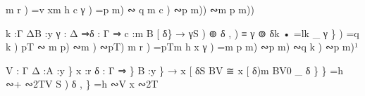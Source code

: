 \documentclass{acm_proc_article-sp}
\begin{document}
{\begin{code}
m r ) =\AgdaFunction{ [⊚]}v xm h c γ ) =p m\AgdaFunction{ [⊚]}) ∾ q m c ) ∾p m\AgdaFunction{ [⊚]})\AgdaFunction{ -}) ∾m p m\AgdaFunction{ [⊚]})\AgdaFunction{ -})

k :\AgdaBound{\{}Γ Δ\AgdaBound{\{}B :y \AgdaBound{(}γ : Δ ⇒\AgdaBound{\{}δ : Γ ⇒ \AgdaBound{\{}c :m \AgdaBound{(}B [ δ\AgdaFunction{ ]}\} → \AgdaBound{(}γ\AgdaFunction{ +}S ) ⊚ \AgdaBound{(}δ , ) ≡ γ ⊚ δk • =lk \AgdaInductiveConstructor{(\_,}\_ γ \AgdaBound{\{}\} ) =q k ) p\AgdaFunction{ [⊚]}T ∾ m p\AgdaFunction{ [+S]}) ∾m ) ∾p\AgdaFunction{ [⊚]}T\AgdaFunction{ -})
m r ) =pTm h x γ ) =m p m\AgdaFunction{ [+S]}) ∾p m\AgdaFunction{ [⊚]}) ∾q k ) ∾p m\AgdaFunction{ [⊚]})\AgdaFunction{ -}¹


\AgdaFunction{
[+S]}V : \AgdaBound{\{}Γ Δ :\AgdaBound{\{}A :y \}
         \AgdaBound{(}x :r \AgdaBound{\{}δ : Γ ⇒ \}
         \AgdaBound{\{}B :y \}
         → x [ δ\AgdaFunction{ +}S B\AgdaFunction{ ]}V ≅ \AgdaBound{(}x [ δ\AgdaFunction{ ]})m B\AgdaFunction{
[+S]}V0 \AgdaInductiveConstructor{\{\_,}\_ δ \AgdaBound{\{}\} \} =h ∾+ ∾2T\AgdaFunction{
[+S]}V S ) \AgdaBound{\{}δ , \} =h ∾\AgdaFunction{ [+S]}V x ∾2T


\end{code}}
\end{document}
